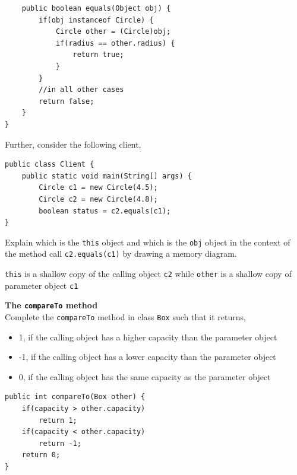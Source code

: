 \begin{questions}
\begin{lstlisting}
	public boolean equals(Object obj) {
		if(obj instanceof Circle) {
			Circle other = (Circle)obj;
			if(radius == other.radius) {
				return true;
			}
		}
		//in all other cases
		return false;
	}
}
\end{lstlisting}

Further, consider the following client,

\begin{lstlisting}
public class Client {
	public static void main(String[] args) {
		Circle c1 = new Circle(4.5);
		Circle c2 = new Circle(4.8);
		boolean status = c2.equals(c1);
}
\end{lstlisting}

Explain which is the \texttt{this} object and which is the \texttt{obj} object in the context of the method call \texttt{c2.equals(c1)} by drawing a memory diagram.

\begin{solution}
\texttt{this} is a shallow copy of the calling object \texttt{c2} while \texttt{other} is a shallow copy of parameter object \texttt{c1}
\end{solution}

\question \textbf{The \texttt{compareTo} method}\\
Complete the \texttt{compareTo} method in class \texttt{Box} such that it returns,

\begin{itemize}
\item 1, if the calling object has a higher capacity than the parameter object
\item -1, if the calling object has a lower capacity than the parameter object
\item 0, if the calling object has the same capacity as the parameter object
\end{itemize}

\begin{solution}
\begin{lstlisting}
public int compareTo(Box other) {
	if(capacity > other.capacity)
		return 1;
	if(capacity < other.capacity)
		return -1;
	return 0;
}
\end{lstlisting}
\end{solution}
\end{questions}



